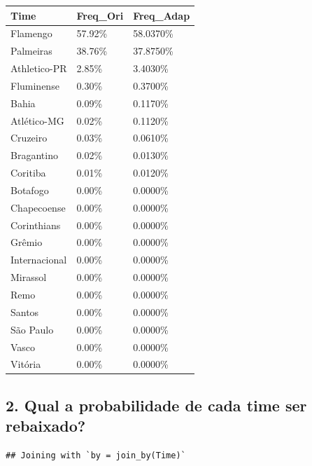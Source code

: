 \documentclass[11pt,]{article}
\begin{document}
\begin{longtable}[]{@{}lll@{}}
\toprule\noalign{}
Time & Freq\_Ori & Freq\_Adap \\
\midrule\noalign{}
\endhead
\bottomrule\noalign{}
\endlastfoot
Flamengo & 57.92\% & 58.0370\% \\
Palmeiras & 38.76\% & 37.8750\% \\
Athletico-PR & 2.85\% & 3.4030\% \\
Fluminense & 0.30\% & 0.3700\% \\
Bahia & 0.09\% & 0.1170\% \\
Atlético-MG & 0.02\% & 0.1120\% \\
Cruzeiro & 0.03\% & 0.0610\% \\
Bragantino & 0.02\% & 0.0130\% \\
Coritiba & 0.01\% & 0.0120\% \\
Botafogo & 0.00\% & 0.0000\% \\
Chapecoense & 0.00\% & 0.0000\% \\
Corinthians & 0.00\% & 0.0000\% \\
Grêmio & 0.00\% & 0.0000\% \\
Internacional & 0.00\% & 0.0000\% \\
Mirassol & 0.00\% & 0.0000\% \\
Remo & 0.00\% & 0.0000\% \\
Santos & 0.00\% & 0.0000\% \\
São Paulo & 0.00\% & 0.0000\% \\
Vasco & 0.00\% & 0.0000\% \\
Vitória & 0.00\% & 0.0000\% \\
\end{longtable}

\newpage

\hypertarget{qual-a-probabilidade-de-cada-time-ser-rebaixado-1}{%
\subsection{2. Qual a probabilidade de cada time ser
rebaixado?}\label{qual-a-probabilidade-de-cada-time-ser-rebaixado-1}}

\begin{verbatim}
## Joining with `by = join_by(Time)`
\end{verbatim}
\end{document}
